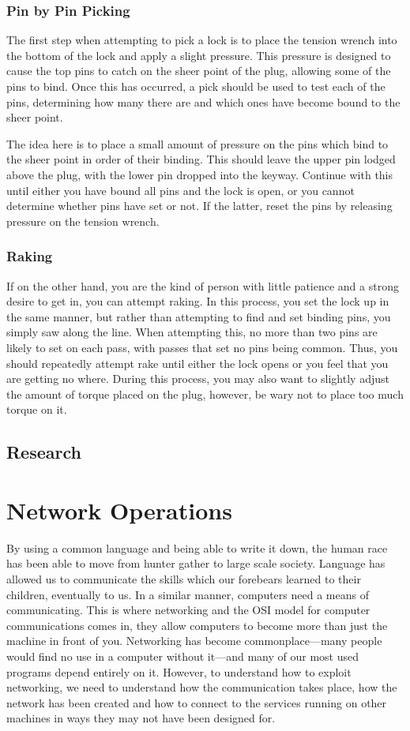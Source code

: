 \documentclass[a4paper,11pt]{report}
\begin{document}
		\subsection{Pin by Pin Picking}
			The first step when attempting to pick a lock is to place the tension wrench into the bottom of the lock and apply a slight pressure. 
			This pressure is designed to cause the top pins to catch on the sheer point of the plug, allowing some of the pins to bind. 
			Once this has occurred, a pick should be used to test each of the pins, determining how many there are and which ones have become bound to the sheer point. 

			The idea here is to place a small amount of pressure on the pins which bind to the sheer point in order of their binding. 
			This should leave the upper pin lodged above the plug, with the lower pin dropped into the keyway. 
			Continue with this until either you have bound all pins and the lock is open, or you cannot determine whether pins have set or not. 
			If the latter, reset the pins by releasing pressure on the tension wrench. 
		\subsection{Raking}
			If on the other hand, you are the kind of person with little patience and a strong desire to get in, you can attempt raking. 
			In this process, you set the lock up in the same manner, but rather than attempting to find and set binding pins, you simply saw along the line. 
			When attempting this, no more than two pins are likely to set on each pass, with passes that set no pins being common. 
			Thus, you should repeatedly attempt rake until either the lock opens or you feel that you are getting no where. 
			During this process, you may also want to slightly adjust the amount of torque placed on the plug, however, be wary not to place too much torque on it. 

	\section{Research}
\chapter{Network Operations}
	\label{ch:NetworkOperations}
	By using a common language and being able to write it down, the human race has been able to move from hunter gather to large scale society. 
	Language has allowed us to communicate the skills which our forebears learned to their children, eventually to us. 
	In a similar manner, computers need a means of communicating. 
	This is where networking and the OSI model for computer communications comes in, they allow computers to become more than just the machine in front of you. 
	Networking has become commonplace---many people would find no use in a computer without it---and many of our most used programs depend entirely on it. 
	However, to understand how to exploit networking, we need to understand how the communication takes place, how the network has been created and how to connect to the services running on other machines in ways they may not have been designed for. 
\end{document}

